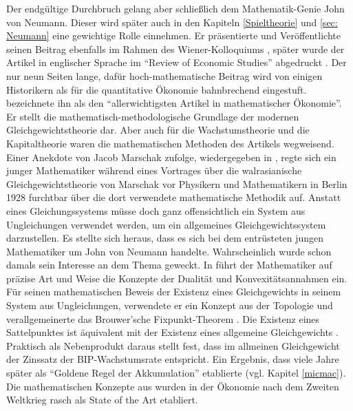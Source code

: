 Der endgültige Durchbruch gelang aber schließlich dem Mathematik-Genie John von Neumann. Dieser wird später auch in den Kapiteln \ref{Spieltheorie} und \ref{sec: Neumann} eine gewichtige Rolle einnehmen. Er präsentierte und Veröffentlichte seinen Beitrag ebenfalls im Rahmen des Wiener-Kolloquiums \parencite{Neumann1937}, später wurde der Artikel in englischer Sprache im "`Review of Economic Studies"' abgedruckt \parencite{Neumann1945}. Der nur neun Seiten lange, dafür hoch-mathematische Beitrag wird von einigen Historikern als für die quantitative Ökonomie bahnbrechend eingestuft. \textcite[S. 13]{Weintraub1983} bezeichnete ihn als den "`allerwichtigsten Artikel in mathematischer Ökonomie"'. Er stellt die mathematisch-methodologische Grundlage der modernen Gleichgewichtstheorie dar. Aber auch für die Wachstumstheorie und die Kapitaltheorie waren die mathematischen Methoden des Artikels wegweisend. Einer Anekdote von Jacob Marschak zufolge, wiedergegeben in \textcite[S. 13]{Weintraub1983}, regte sich ein junger Mathematiker während eines Vortrages über die walrasianische Gleichgewichtstheorie von Marschak vor Physikern und Mathematikern in Berlin 1928 furchtbar über die dort verwendete mathematische Methodik auf. Anstatt eines Gleichungssystems müsse doch ganz offensichtlich ein System aus Ungleichungen verwendet werden, um ein allgemeines Gleichgewichtssystem darzustellen. Es stellte sich heraus, dass es sich bei dem entrüsteten jungen Mathematiker um John von Neumann handelte. Wahrscheinlich wurde schon damals sein Interesse an dem Thema geweckt.
In \textcite{Neumann1937, Neumann1945} führt der Mathematiker auf präzise Art und Weise die Konzepte der Dualität und Konvexitätsannahmen ein. Für seinen mathematischen Beweis der Existenz eines Gleichgewichts in seinem System aus Ungleichungen, verwendete er ein Konzept aus der Topologie und verallgemeinerte das Brouwer'sche Fixpunkt-Theorem \parencite[S. 1]{Neumann1945}. Die Existenz eines Sattelpunktes ist äquivalent mit der Existenz eines allgemeine Gleichgewichts \parencite[S. 14]{Weintraub1983}. Praktisch als Nebenprodukt daraus stellt \textcite{Neumann1945} fest, dass im allmeinen Gleichgewicht der Zinssatz der BIP-Wachstumsrate entspricht. Ein Ergebnis, dass viele Jahre später \textcite{Phelps1961} als "`Goldene Regel der Akkumulation"' etablierte (vgl. Kapitel \ref{micmac}). Die mathematischen Konzepte aus \textcite{Neumann1945} wurden in der Ökonomie nach dem Zweiten Weltkrieg rasch als State of the Art etabliert. 





